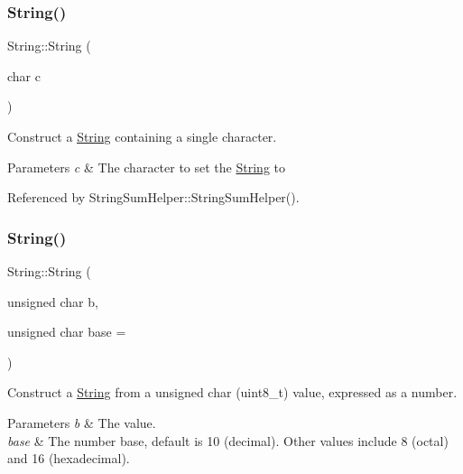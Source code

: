 \subsubsection{\texorpdfstring{String()}{String()}\hspace{0.1cm}{\footnotesize\ttfamily [6/13]}}
{\footnotesize\ttfamily String\+::\+String (\begin{DoxyParamCaption}\item[{char}]{c }\end{DoxyParamCaption})\hspace{0.3cm}{\ttfamily [explicit]}}



Construct a \hyperlink{class_string}{String} containing a single character. 


\begin{DoxyParams}{Parameters}
{\em c} & The character to set the \hyperlink{class_string}{String} to \\
\hline
\end{DoxyParams}


Referenced by String\+Sum\+Helper\+::\+String\+Sum\+Helper().

\mbox{\label{class_string_adb05525482f5991815322239e5504539}} 
\subsubsection{\texorpdfstring{String()}{String()}\hspace{0.1cm}{\footnotesize\ttfamily [7/13]}}
{\footnotesize\ttfamily String\+::\+String (\begin{DoxyParamCaption}\item[{unsigned char}]{b,  }\item[{unsigned char}]{base = {} }\end{DoxyParamCaption})\hspace{0.3cm}{\ttfamily [explicit]}}



Construct a \hyperlink{class_string}{String} from a unsigned char (uint8\+\_\+t) value, expressed as a number. 


\begin{DoxyParams}{Parameters}
{\em b} & The value.\\
\hline
{\em base} & The number base, default is 10 (decimal). Other values include 8 (octal) and 16 (hexadecimal). \\
\hline
\end{DoxyParams}


